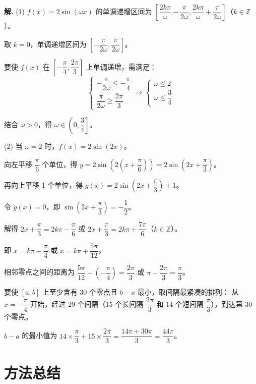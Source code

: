 \documentclass[11pt]{ctexrep}
\begin{document}
\textbf{解.} (1) $f(x) = 2\sin(\omega x)$ 的单调递增区间为 $\left[\dfrac{2k\pi}{\omega} - \dfrac{\pi}{2\omega}, \dfrac{2k\pi}{\omega} + \dfrac{\pi}{2\omega}\right]$（$k \in \mathbb{Z}$）。

取 $k = 0$，单调递增区间为 $\left[-\dfrac{\pi}{2\omega}, \dfrac{\pi}{2\omega}\right]$。

要使 $f(x)$ 在 $\left[-\dfrac{\pi}{4}, \dfrac{2\pi}{3}\right]$ 上单调递增，需满足：
\[
    \begin{cases}
        -\dfrac{\pi}{2\omega} \leqslant -\dfrac{\pi}{4} \\
        \dfrac{\pi}{2\omega} \geqslant \dfrac{2\pi}{3}
    \end{cases}
    \Rightarrow
    \begin{cases}
        \omega \leqslant 2 \\
        \omega \leqslant \dfrac{3}{4}
    \end{cases}
\]

结合 $\omega > 0$，得 $\omega \in \left(0, \dfrac{3}{4}\right]$。

(2) 当 $\omega = 2$ 时，$f(x) = 2\sin(2x)$。

向左平移 $\dfrac{\pi}{6}$ 个单位，得 $y = 2\sin\left(2\left(x + \dfrac{\pi}{6}\right)\right) = 2\sin\left(2x + \dfrac{\pi}{3}\right)$。

再向上平移 1 个单位，得 $g(x) = 2\sin\left(2x + \dfrac{\pi}{3}\right) + 1$。

令 $g(x) = 0$，即 $\sin\left(2x + \dfrac{\pi}{3}\right) = -\dfrac{1}{2}$。

解得 $2x + \dfrac{\pi}{3} = 2k\pi - \dfrac{\pi}{6}$ 或 $2x + \dfrac{\pi}{3} = 2k\pi + \dfrac{7\pi}{6}$（$k \in \mathbb{Z}$）。

即 $x = k\pi - \dfrac{\pi}{4}$ 或 $x = k\pi + \dfrac{5\pi}{12}$。

相邻零点之间的距离为 $\dfrac{5\pi}{12} - \left(-\dfrac{\pi}{4}\right) = \dfrac{2\pi}{3}$ 或 $\pi - \dfrac{2\pi}{3} = \dfrac{\pi}{3}$。

要使 $[a, b]$ 上至少含有 30 个零点且 $b - a$ 最小，取间隔最紧凑的排列：
从 $x = -\dfrac{\pi}{4}$ 开始，经过 29 个间隔（15 个长间隔 $\dfrac{2\pi}{3}$ 和 14 个短间隔 $\dfrac{\pi}{3}$），到达第 30 个零点。

$b - a$ 的最小值为 $14 \times \dfrac{\pi}{3} + 15 \times \dfrac{2\pi}{3} = \dfrac{14\pi + 30\pi}{3} = \dfrac{44\pi}{3}$。

\section*{方法总结}
\end{document}
